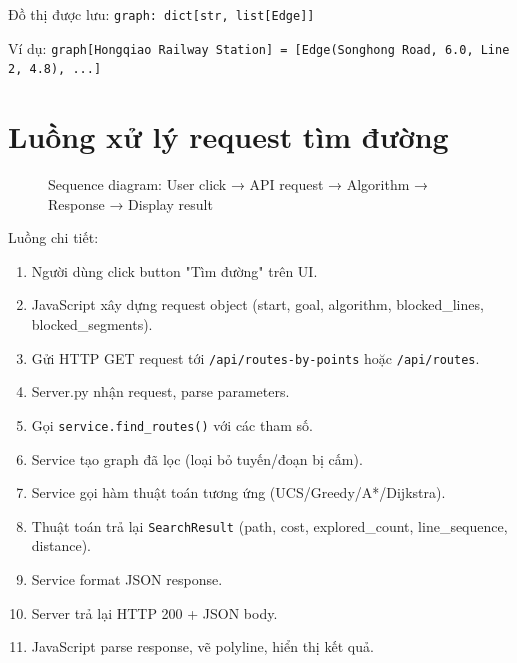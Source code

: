 Đồ thị được lưu: \texttt{graph: dict[str, list[Edge]]}

Ví dụ: \texttt{graph[\textquotedbl Hongqiao Railway Station\textquotedbl] = [Edge(\textquotedbl Songhong Road\textquotedbl, 6.0, \textquotedbl Line 2\textquotedbl, 4.8), ...]}

\section{Luồng xử lý request tìm đường}

\begin{figure}[H]
  \centering
  \caption{Sequence diagram: User click → API request → Algorithm → Response → Display result}
  \label{fig:sequence}
\end{figure}

Luồng chi tiết:
\begin{enumerate}
  \item Người dùng click button "Tìm đường" trên UI.
  \item JavaScript xây dựng request object (start, goal, algorithm, blocked\_lines, blocked\_segments).
  \item Gửi HTTP GET request tới \texttt{/api/routes-by-points} hoặc \texttt{/api/routes}.
  \item Server.py nhận request, parse parameters.
  \item Gọi \texttt{service.find\_routes()} với các tham số.
  \item Service tạo graph đã lọc (loại bỏ tuyến/đoạn bị cấm).
  \item Service gọi hàm thuật toán tương ứng (UCS/Greedy/A*/Dijkstra).
  \item Thuật toán trả lại \texttt{SearchResult} (path, cost, explored\_count, line\_sequence, distance).
  \item Service format JSON response.
  \item Server trả lại HTTP 200 + JSON body.
  \item JavaScript parse response, vẽ polyline, hiển thị kết quả.
\end{enumerate}

